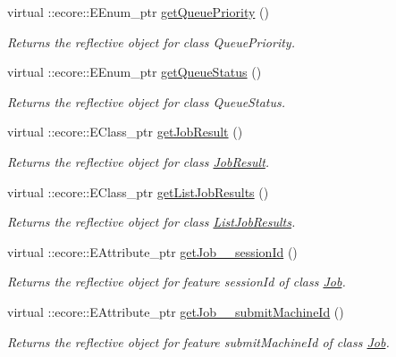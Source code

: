 \begin{DoxyCompactItemize}
virtual ::ecore::EEnum\_\-ptr \hyperlink{classTMS__Data_1_1TMS__DataPackage_afe2ef432b072325b49e0b8529878cfbf}{getQueuePriority} ()
\begin{DoxyCompactList}\small\item\em Returns the reflective object for class QueuePriority. \item\end{DoxyCompactList}\item 
virtual ::ecore::EEnum\_\-ptr \hyperlink{classTMS__Data_1_1TMS__DataPackage_a148ed27a60c34155da179470a1de50b6}{getQueueStatus} ()
\begin{DoxyCompactList}\small\item\em Returns the reflective object for class QueueStatus. \item\end{DoxyCompactList}\item 
virtual ::ecore::EClass\_\-ptr \hyperlink{classTMS__Data_1_1TMS__DataPackage_a2d8724dc6675b1ad6104a2c1025eeab2}{getJobResult} ()
\begin{DoxyCompactList}\small\item\em Returns the reflective object for class \hyperlink{classTMS__Data_1_1JobResult}{JobResult}. \item\end{DoxyCompactList}\item 
virtual ::ecore::EClass\_\-ptr \hyperlink{classTMS__Data_1_1TMS__DataPackage_ad79a636a992bd9fb8aab788765ca5e6e}{getListJobResults} ()
\begin{DoxyCompactList}\small\item\em Returns the reflective object for class \hyperlink{classTMS__Data_1_1ListJobResults}{ListJobResults}. \item\end{DoxyCompactList}\item 
virtual ::ecore::EAttribute\_\-ptr \hyperlink{classTMS__Data_1_1TMS__DataPackage_a421ce0508d373dfc8e8f1b8aa1546936}{getJob\_\-\_\-sessionId} ()
\begin{DoxyCompactList}\small\item\em Returns the reflective object for feature sessionId of class \hyperlink{classTMS__Data_1_1Job}{Job}. \item\end{DoxyCompactList}\item 
virtual ::ecore::EAttribute\_\-ptr \hyperlink{classTMS__Data_1_1TMS__DataPackage_abff4879941bb57697ca20ea0b0b84f35}{getJob\_\-\_\-submitMachineId} ()
\begin{DoxyCompactList}\small\item\em Returns the reflective object for feature submitMachineId of class \hyperlink{classTMS__Data_1_1Job}{Job}. \item\end{DoxyCompactList}\item 

\end{DoxyCompactItemize}
